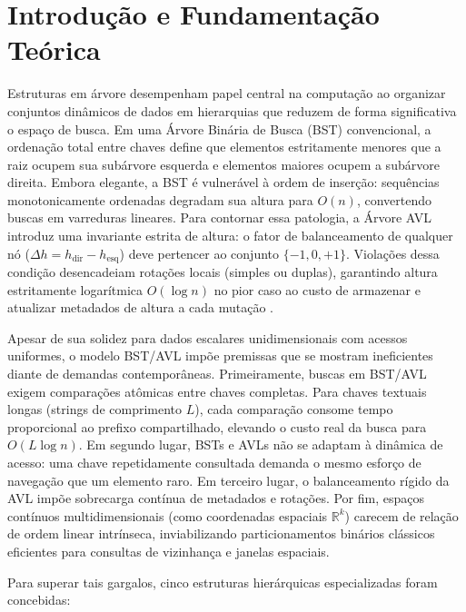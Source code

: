 \documentclass[11pt,a4paper]{article}
\newcommand{\Ogrande}[1]{\ensuremath{O\!\left(#1\right)}}
\begin{document}
\vspace{0.12cm}

\section{Introdução e Fundamentação Teórica}

Estruturas em árvore desempenham papel central na computação ao organizar conjuntos dinâmicos de dados em hierarquias que reduzem de forma significativa o espaço de busca. Em uma Árvore Binária de Busca (BST) convencional, a ordenação total entre chaves define que elementos estritamente menores que a raiz ocupem sua subárvore esquerda e elementos maiores ocupem a subárvore direita. Embora elegante, a BST é vulnerável à ordem de inserção: sequências monotonicamente ordenadas degradam sua altura para $\Ogrande{n}$, convertendo buscas em varreduras lineares. Para contornar essa patologia, a Árvore AVL introduz uma invariante estrita de altura: o fator de balanceamento de qualquer nó ($\Delta h = h_{\text{dir}} - h_{\text{esq}}$) deve pertencer ao conjunto $\{-1, 0, +1\}$. Violações dessa condição desencadeiam rotações locais (simples ou duplas), garantindo altura estritamente logarítmica $\Ogrande{\log n}$ no pior caso ao custo de armazenar e atualizar metadados de altura a cada mutação \cite{cormen2022}.

Apesar de sua solidez para dados escalares unidimensionais com acessos uniformes, o modelo BST/AVL impõe premissas que se mostram ineficientes diante de demandas contemporâneas. Primeiramente, buscas em BST/AVL exigem comparações atômicas entre chaves completas. Para chaves textuais longas (strings de comprimento $L$), cada comparação consome tempo proporcional ao prefixo compartilhado, elevando o custo real da busca para $\Ogrande{L \log n}$. Em segundo lugar, BSTs e AVLs não se adaptam à dinâmica de acesso: uma chave repetidamente consultada demanda o mesmo esforço de navegação que um elemento raro. Em terceiro lugar, o balanceamento rígido da AVL impõe sobrecarga contínua de metadados e rotações. Por fim, espaços contínuos multidimensionais (como coordenadas espaciais $\mathbb{R}^k$) carecem de relação de ordem linear intrínseca, inviabilizando particionamentos binários clássicos eficientes para consultas de vizinhança e janelas espaciais.

Para superar tais gargalos, cinco estruturas hierárquicas especializadas foram concebidas:
\end{document}
